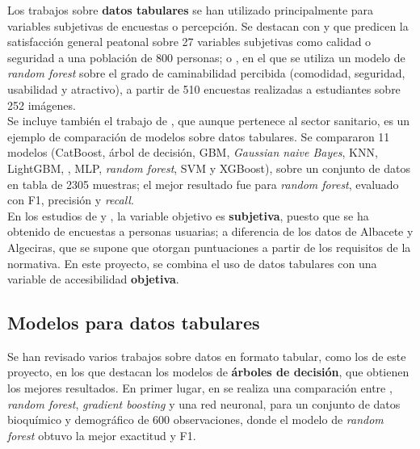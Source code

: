 Los trabajos sobre \textbf{datos tabulares} se han utilizado principalmente para variables subjetivas de encuestas o percepción. Se destacan \textcite{dong2019} con  y  que predicen la satisfacción general peatonal sobre 27 variables subjetivas como calidad o seguridad a una población de 800 personas; o \textcite{li2024gsv}, en el que se utiliza un modelo de \textit{random forest} sobre el grado de caminabilidad percibida (comodidad, seguridad, usabilidad y atractivo), a partir de 510 encuestas realizadas a estudiantes sobre 252 imágenes.
\\

Se incluye también el trabajo de \textcite{wang2026}, que aunque pertenece al sector sanitario, es un ejemplo de comparación de modelos sobre datos tabulares. Se compararon 11 modelos (CatBoost, árbol de decisión, GBM, \textit{Gaussian naive Bayes}, KNN, LightGBM, , MLP, \textit{random forest}, SVM y XGBoost), sobre un conjunto de datos en tabla de 2305 muestras; el mejor resultado fue para \textit{random forest}, evaluado con F1, precisión y \textit{recall}.
\\

En los estudios de \textcite{dong2019} y \textcite{li2024gsv}, la variable objetivo es \textbf{subjetiva}, puesto que se ha obtenido de encuestas a personas usuarias; a diferencia de los datos de Albacete y Algeciras, que se supone que otorgan puntuaciones a partir de los requisitos de la normativa. En este proyecto, se combina el uso de datos tabulares con una variable de accesibilidad \textbf{objetiva}.
\\

\subsection{Modelos para datos tabulares}
\label{subsec:ml-tabular}

Se han revisado varios trabajos sobre datos en formato tabular, como los de este proyecto, en los que destacan los modelos de \textbf{árboles de decisión}, que obtienen los mejores resultados. En primer lugar, en \textcite{knights2026} se realiza una comparación entre , \textit{random forest}, \textit{gradient boosting} y una red neuronal, para un conjunto de datos bioquímico y demográfico de 600 observaciones, donde el modelo de \textit{random forest} obtuvo la mejor exactitud y F1.
\\


